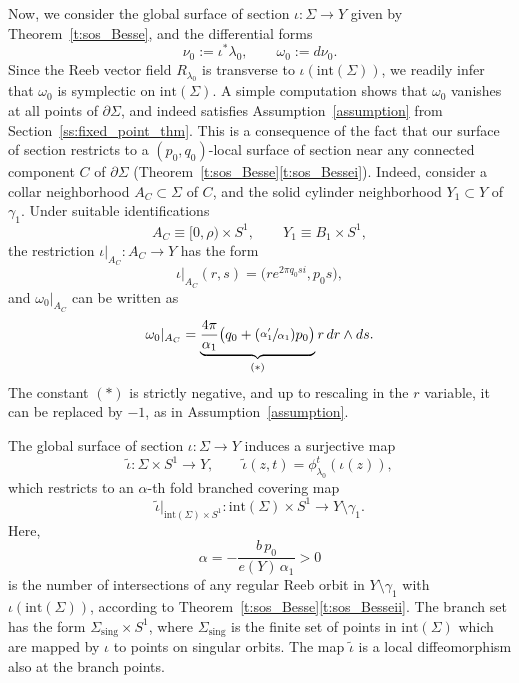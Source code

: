 \documentclass[11pt]{article}
\numberwithin{equation}{section}
\newcommand{\Psfrac}[2]{(\sfrac{#1}{#2})}
\theoremstyle{definition}
\let\eul e
\let\diff d
\begin{document}
Now, we consider the global surface of section $\iota:\Sigma\to Y$ given by Theorem~\ref{t:sos_Besse}, and the differential forms
\[
\nu_0:=\iota^*\lambda_0,
\qquad
\omega_0:=\diff\nu_0.
\]
Since the Reeb vector field $R_{\lambda_0}$ is transverse to $\iota(\mathrm{int}(\Sigma))$, we readily infer that $\omega_0$ is symplectic on $\mathrm{int}(\Sigma)$. A simple computation shows that $\omega_0$ vanishes at all points of $\partial\Sigma$, and indeed satisfies Assumption~\ref{assumption} from Section~\ref{ss:fixed_point_thm}. This is a consequence of the fact that our surface of section restricts to a $(p_0,q_0)$-local surface of section near any connected component $C$ of $\partial\Sigma$ (Theorem~\ref{t:sos_Besse}\eqref{t:sos_Bessei}). Indeed, consider a collar neighborhood $A_C\subset \Sigma$ of $C$, and the solid cylinder neighborhood $Y_1\subset Y$ of $\gamma_1$. Under suitable identifications
\[
A_C\equiv [0,\rho)\times S^1,\qquad Y_1\equiv B_1\times S^1,
\]
the restriction $\iota|_{A_C}:A_C\to Y$ has the form
\[
\iota|_{A_C}(r,s)=\big( r e^{2\pi q_0 s i},p_0s \big),
\]
and $\omega_0|_{A_C}$ can be written as
\begin{equation}
\label{e:omega_0_annulus}
\omega_0|_{A_C}
=
\underbrace{\frac{4\pi}{\alpha_1} \big( q_0+\Psfrac{\alpha_1'}{\alpha_1}p_0\big)}_{(*)} r\,\diff r\wedge\diff s.
\end{equation}
The constant $(*)$ is strictly negative, and up to rescaling in the $r$ variable, it can be replaced by $-1$, as in Assumption~\ref{assumption}.

The global surface of section $\iota:\Sigma\to Y$ induces a surjective map
\[
\tilde \iota:\Sigma\times S^1\to Y,\qquad \tilde\iota(z,t)=\phi_{\lambda_0}^t(\iota(z)),
\]
which restricts to an $\alpha$-th fold branched covering map
\begin{equation}
\label{e:alpha_covering_map}
\tilde \iota|_{\mathrm{int}(\Sigma)\times S^1}:\mathrm{int}(\Sigma)\times S^1\to Y\setminus\gamma_1.
\end{equation}
Here,
\[
\alpha=- \frac{b\, p_0}{\eul(Y)\, \alpha_1}>0
\]
is the number of intersections of any regular Reeb orbit in $Y\setminus\gamma_1$ with $\iota(\mathrm{int}(\Sigma))$, according to Theorem~\ref{t:sos_Besse}\eqref{t:sos_Besseii}. The branch set has the form $\Sigma_{\mathrm{sing}}\times S^1$, where $\Sigma_{\mathrm{sing}}$ is the finite set of points in $\mathrm{int}(\Sigma)$ which are mapped by $\iota$ to points on singular orbits. The map $\tilde\iota$ is a local diffeomorphism also at the branch points.
\end{document}

